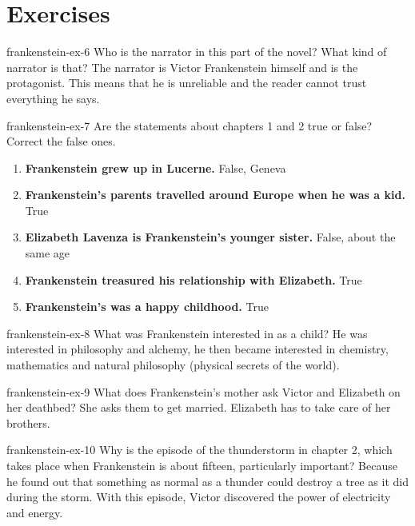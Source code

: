 \documentclass[preview]{standalone}
\begin{document}
\genpage

\section{Exercises}

\begin{snippetexercise}{frankenstein-ex-6}
    {Who is the narrator in this part of the novel? What kind of narrator is that?}
    The narrator is Victor Frankenstein himself and is the protagonist.
    This means that he is unreliable and the reader cannot trust everything he says.
\end{snippetexercise}

\begin{snippetexercise}{frankenstein-ex-7}
    {Are the statements about chapters 1 and 2 true or false? Correct the false ones.}
    \begin{enumerate}
        \item \textbf{Frankenstein grew up in Lucerne.} False, Geneva
        \item \textbf{Frankenstein's parents travelled around Europe when he was a kid.} True
        \item \textbf{Elizabeth Lavenza is Frankenstein's younger sister.} False, about the same age
        \item \textbf{Frankenstein treasured his relationship with Elizabeth.} True
        \item \textbf{Frankenstein's was a happy childhood.} True
    \end{enumerate}
\end{snippetexercise}

\begin{snippetexercise}{frankenstein-ex-8}
    {What was Frankenstein interested in as a child?}
    He was interested in philosophy and alchemy, he then became interested in
    chemistry, mathematics and natural philosophy (physical secrets of the world).
\end{snippetexercise}

\begin{snippetexercise}{frankenstein-ex-9}
    {What does Frankenstein's mother ask Victor and Elizabeth on her deathbed?}
    She asks them to get married. Elizabeth has to take care of her brothers.
\end{snippetexercise}

\begin{snippetexercise}{frankenstein-ex-10}
    {Why is the episode of the thunderstorm in chapter 2, which takes place when Frankenstein is
    about fifteen, particularly important?}
    Because he found out that something as normal as a thunder could
    destroy a tree as it did  during the storm.
    With this episode, Victor discovered the power of electricity and energy.
\end{snippetexercise}
\end{document}
